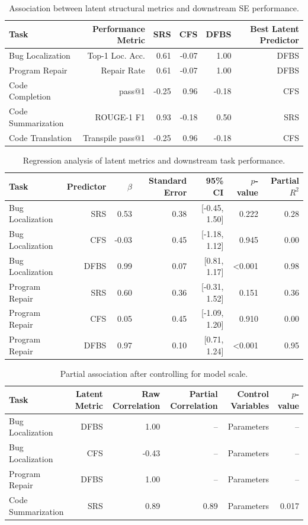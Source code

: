 \begin{table}[t]
\centering
\caption{Association between latent structural metrics and downstream SE performance.}
\label{tab:assoc}
\begin{tabular}{lrrrrr}
\toprule
Task & Performance Metric & SRS & CFS & DFBS & Best Latent Predictor \\
\midrule
Bug Localization & Top-1 Loc. Acc. & 0.61 & -0.07 & 1.00 & DFBS \\
Program Repair & Repair Rate & 0.61 & -0.07 & 1.00 & DFBS \\
Code Completion & pass@1 & -0.25 & 0.96 & -0.18 & CFS \\
Code Summarization & ROUGE-1 F1 & 0.93 & -0.18 & 0.50 & SRS \\
Code Translation & Transpile pass@1 & -0.25 & 0.96 & -0.18 & CFS \\
\bottomrule
\end{tabular}
\end{table}

\begin{table}[t]
\centering
\caption{Regression analysis of latent metrics and downstream task performance.}
\label{tab:reg}
\begin{tabular}{lrrrrrr}
\toprule
Task & Predictor & $\beta$ & Standard Error & 95\% CI & $p$-value & Partial $R^{2}$ \\
\midrule
Bug Localization & SRS & 0.53 & 0.38 & [-0.45, 1.50] & 0.222 & 0.28 \\
Bug Localization & CFS & -0.03 & 0.45 & [-1.18, 1.12] & 0.945 & 0.00 \\
Bug Localization & DFBS & 0.99 & 0.07 & [0.81, 1.17] & \textless{}0.001 & 0.98 \\
Program Repair & SRS & 0.60 & 0.36 & [-0.31, 1.52] & 0.151 & 0.36 \\
Program Repair & CFS & 0.05 & 0.45 & [-1.09, 1.20] & 0.910 & 0.00 \\
Program Repair & DFBS & 0.97 & 0.10 & [0.71, 1.24] & \textless{}0.001 & 0.95 \\
\bottomrule
\end{tabular}
\end{table}

\begin{table}[t]
\centering
\caption{Partial association after controlling for model scale.}
\label{tab:partial}
\begin{tabular}{lrrrrr}
\toprule
Task & Latent Metric & Raw Correlation & Partial Correlation & Control Variables & $p$-value \\
\midrule
Bug Localization & DFBS & 1.00 & -- & Parameters & -- \\
Bug Localization & CFS & -0.43 & -- & Parameters & -- \\
Program Repair & DFBS & 1.00 & -- & Parameters & -- \\
Code Summarization & SRS & 0.89 & 0.89 & Parameters & 0.017 \\
\bottomrule
\end{tabular}
\end{table}
